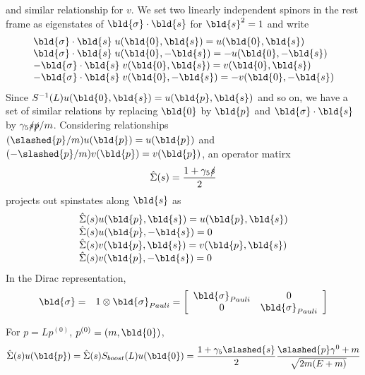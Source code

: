 and similar relationship for $v$. We set two linearly independent spinors 
in the rest frame as eigenstates of $\bld{\sigma}\cdot \bld{s}$ 
for $\bld{s}^2 = 1$
and write
\begin{eqnarray}
\begin{array}{l}
\bld{\sigma}\cdot \bld{s}\; u(\bld{0}, \bld{s} ) = u(\bld{0}, \bld{s} )
\\
\bld{\sigma}\cdot \bld{s}\; u(\bld{0}, -\bld{s} ) = -u(\bld{0}, -\bld{s} )
\\
- \bld{\sigma}\cdot \bld{s}\; v(\bld{0}, \bld{s} ) =  v(\bld{0}, \bld{s} )
\\
- \bld{\sigma}\cdot \bld{s}\; v(\bld{0}, -\bld{s} ) =  - v(\bld{0}, -\bld{s} )
\end{array}
\end{eqnarray}
Since $S^{-1}(L) u(\bld{0},\bld{s}) = u(\bld{p},\bld{s})$ and so on, we have
a set of similar relations by replacing $\bld{0}$ by $\bld{p}$ and
$\bld{\sigma}\cdot \bld{s}$ by $\gamma_5 \slashed{s} \slashed{p} / m$.
Considering relationships $(\slashed{p}/m)u(\bld{p}) = u(\bld{p})$
and $(-\slashed{p}/m)v(\bld{p}) = v(\bld{p})$, an operator matirx
\begin{eqnarray}
\hat{\Sigma}(s)
 = 
\frac{1 + \gamma_5 \slashed{s}}{2}
 \end{eqnarray}
projects out 
spinstates along $\bld{s}$ as
\begin{eqnarray}
\begin{array}{l}
\hat{\Sigma}(s) u(\bld{p}, \bld{s}) = u(\bld{p}, \bld{s})
\\
\hat{\Sigma}(s) u(\bld{p}, -\bld{s}) = 0
\\
\hat{\Sigma}(s) v(\bld{p}, \bld{s}) = v(\bld{p}, \bld{s})
\\
\hat{\Sigma}(s) v(\bld{p}, -\bld{s}) = 0
\end{array}
\end{eqnarray}
In the Dirac representation,
\begin{eqnarray}
\bld{\sigma}
&=&
1 \otimes \bld{\sigma}_{Pauli}
=
\left[
\begin{array}{cc}
\bld{\sigma}_{Pauli} & 0 \\
0 & \bld{\sigma}_{Pauli}
\end{array}
\right]
\end{eqnarray}


\bigskip

For $p = Lp^{(0)}$, $p^{(0)} = (m, \bld{0})$,
\begin{eqnarray}
\hat{\Sigma}(s) u(\bld{p})
=
\hat{\Sigma}(s)
S_{boost}(L)
u(\bld{0})
=
\frac{1 + \gamma_5 \slashed{s}}{2}
\frac{\slashed{p}\gamma^0 + m}{\sqrt{2m(E+m)}}
\end{eqnarray}

